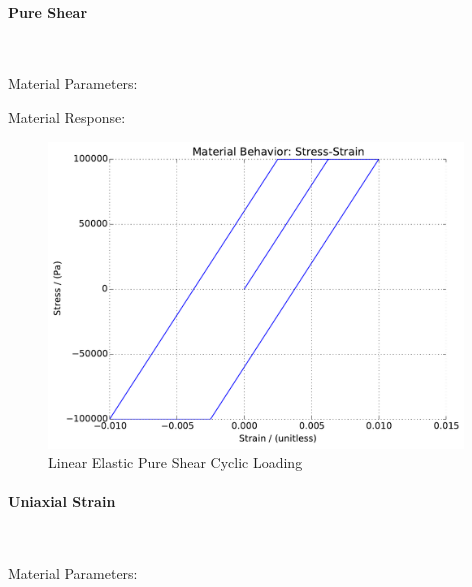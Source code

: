 \documentclass[fleqn,11pt]{article}
\begin{document}
\paragraph{Pure Shear} ~

Material Parameters:


Material Response:
\begin{figure}[H]
\begin{center}
\includegraphics[width=11cm]{../fei_examples/4_1_perfectly_plastic/2pure_shear_cyclic_loading/result.pdf}
\caption{
\label{linear_elastic_shear_mono}
Linear Elastic Pure Shear Cyclic Loading}
\end{center}
\end{figure}

\newpage
\paragraph{Uniaxial Strain} ~

Material Parameters:

\end{document}
